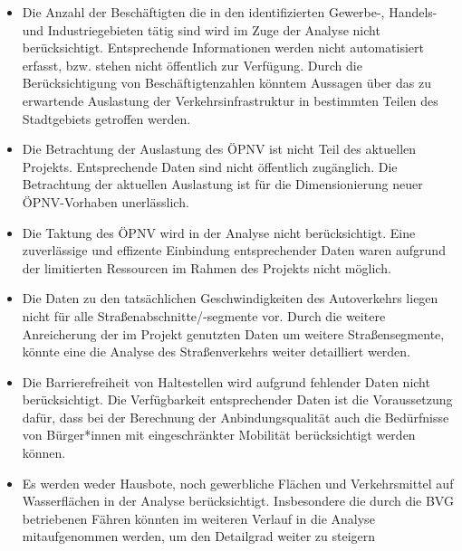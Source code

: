 \begin{itemize}

    \item Die Anzahl der Beschäftigten die in den identifizierten Gewerbe-, Handels- und Industriegebieten tätig sind wird im Zuge der Analyse nicht berücksichtigt. Entsprechende Informationen werden nicht automatisiert erfasst, bzw. stehen nicht öffentlich zur Verfügung. Durch die Berücksichtigung von Beschäftigtenzahlen könntem Aussagen über das zu erwartende Auslastung der Verkehrsinfrastruktur in bestimmten Teilen des Stadtgebiets getroffen werden. 
        
    \item Die Betrachtung der Auslastung des ÖPNV ist nicht Teil des aktuellen Projekts. Entsprechende Daten sind nicht öffentlich zugänglich. Die Betrachtung der aktuellen Auslastung ist für die Dimensionierung neuer ÖPNV-Vorhaben unerlässlich. 
    
    \item Die Taktung des ÖPNV wird in der Analyse nicht berücksichtigt​. Eine zuverlässige und effizente Einbindung entsprechender Daten waren aufgrund der limitierten Ressourcen im Rahmen des Projekts nicht möglich.
    
    \item Die Daten zu den tatsächlichen Geschwindigkeiten des Autoverkehrs liegen nicht für alle Straßenabschnitte/-segmente vor​. Durch die weitere Anreicherung der im Projekt genutzten Daten um weitere Straßensegmente, könnte eine die Analyse des Straßenverkehrs weiter detailliert werden. 
    
    \item Die Barrierefreiheit von Haltestellen wird aufgrund fehlender Daten nicht berücksichtigt​. Die Verfügbarkeit entsprechender Daten ist die Voraussetzung dafür, dass bei der Berechnung der Anbindungsqualität auch die Bedürfnisse von Bürger*innen mit eingeschränkter Mobilität berücksichtigt werden können.
    
    \item Es werden weder Hausbote, noch gewerbliche Flächen und Verkehrsmittel auf Wasserflächen in der Analyse berücksichtigt. Insbesondere die durch die BVG betriebenen Fähren könnten im weiteren Verlauf in die Analyse mitaufgenommen werden, um den Detailgrad weiter zu steigern
    
\end{itemize}


